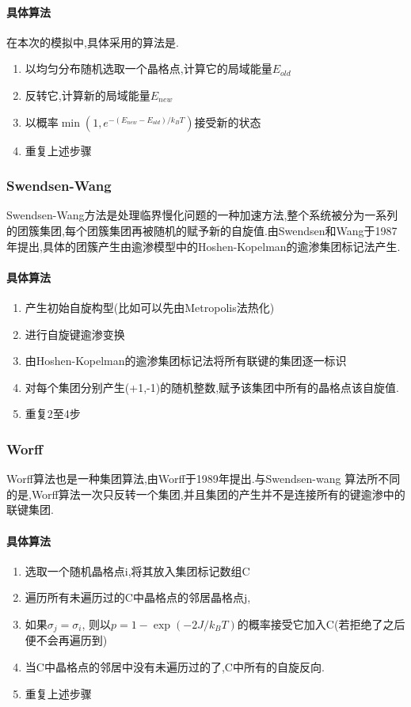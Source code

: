 \documentclass[12pt]{article} %
\begin{document}
\paragraph{具体算法}
在本次的模拟中,具体采用的算法是.
\begin{enumerate}
    \item 以均匀分布随机选取一个晶格点,计算它的局域能量$E_{old}$
    \item 反转它,计算新的局域能量$E_{new}$
    \item 以概率$\min(1,e^{-(E_{new}-E_{old})/k_{B}T})$接受新的状态
    \item 重复上述步骤
\end{enumerate}

\subsubsection{Swendsen-Wang}
Swendsen-Wang方法是处理临界慢化问题的一种加速方法,整个系统被分为一系列的团簇集团,每个团簇集团再被随机的赋予新的自旋值.由Swendsen和Wang于1987年提出\cite{Swendsen:1987eq},具体的团簇产生由逾渗模型中的Hoshen-Kopelman的逾渗集团标记法\cite{Hoshen:1976vg}产生.

\paragraph{具体算法}
\begin{enumerate}
    \item 产生初始自旋构型(比如可以先由Metropolis法热化)
    \item 进行自旋键逾渗变换
    \item 由Hoshen-Kopelman的逾渗集团标记法将所有联键的集团逐一标识
    \item 对每个集团分别产生(+1,-1)的随机整数,赋予该集团中所有的晶格点该自旋值.
    \item 重复2至4步
\end{enumerate}

\subsubsection{Worff}
Worff算法也是一种集团算法,由Worff于1989年提出\cite{Wolff:1988uh}.与Swendsen-wang
算法所不同的是,Worff算法一次只反转一个集团,并且集团的产生并不是连接所有的键逾渗中的联键集团.\cite{Krauth:2003ts}

\paragraph{具体算法}
\begin{enumerate}
    \item 选取一个随机晶格点i,将其放入集团标记数组C
    \item 遍历所有未遍历过的C中晶格点的邻居晶格点j,
    \item 如果$\sigma_{j} = \sigma_{i}$, 则以$p=1-\exp(-2J/k_{B}T)$的概率接受它加入C(若拒绝了之后便不会再遍历到)
    \item 当C中晶格点的邻居中没有未遍历过的了,C中所有的自旋反向.
    \item 重复上述步骤
\end{enumerate}
\end{document}
